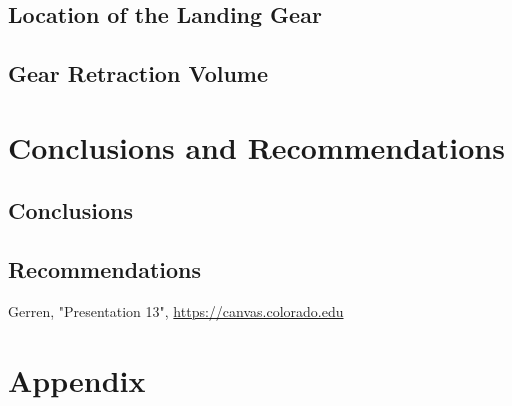 \documentclass[conf]{new-aiaa}
\begin{document}
\subsection{Location of the Landing Gear}


\subsection{Gear Retraction Volume}

\section{Conclusions and Recommendations}
\subsection{Conclusions}

\subsection{Recommendations}

\begin{thebibliography}{99}


 Gerren, "Presentation 13", \url{https://canvas.colorado.edu}

\end{thebibliography}

\section{Appendix}
\end{document}
